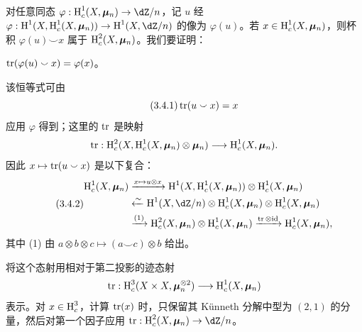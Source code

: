 \subsection{}\label{V:3-3}
对任意同态 $\varphi:\h_c^1(X,\dmu_n)\to\dZ/n$，记 $u$ 经
$\varphi:\h^1(X,\h_c^1(X,\dmu_n))\to\h^1(X,\dZ/n)$ 的像为 $\varphi(u)$。若 $x\in\operatorname{H}_c^1(X,{\bm\mu}_n)$，则杯积 $\varphi(u)\smallsmile x$ 属于 $\operatorname{H}_c^2(X,{\bm\mu}_n)$。我们要证明：

\begin{proposition_}\label{V:3-4}
$\operatorname{tr}(\varphi(u)\smallsmile x)=\varphi(x)$。
\end{proposition_}
该恒等式可由
\begin{equation*}\tag{3.4.1}\label{V:eq:3-4-1}
\operatorname{tr}(u\smallsmile x)=x
\end{equation*}
应用 $\varphi$ 得到；这里的 $\operatorname{tr}$ 是映射
\[
\operatorname{tr}:\operatorname{H}_c^2(X,\operatorname{H}_c^1(X,{\bm\mu}_n)\otimes{\bm\mu}_n)\longrightarrow\operatorname{H}_c^1(X,{\bm\mu}_n).
\]
因此 $x\mapsto\operatorname{tr}(u\smallsmile x)$ 是以下复合：
\begin{equation*}\tag{3.4.2}\label{V:eq:3-4-2}
\begin{aligned}
\h_c^1(X,\dmu_n)&\xrightarrow{x\mapsto u\otimes x}
\h^1(X,\h_c^1(X,\dmu_n))\otimes\h_c^1(X,\dmu_n)\\
&\xleftarrow{\sim}\h^1(X,\dZ/n)\otimes\h_c^1(X,\dmu_n)\otimes\h_c^1(X,\dmu_n)\\
&\xrightarrow{(1)}\h_c^2(X,\dmu_n)\otimes\h_c^1(X,\dmu_n)
\xrightarrow{\tr\otimes\mathrm{id}}\h_c^1(X,\dmu_n),
\end{aligned}
\end{equation*}
其中 (1) 由 $a\otimes b\otimes c\mapsto(a\smallsmile c)\otimes b$ 给出。

将这个态射用相对于第二投影的迹态射
\[
\operatorname{tr}:\operatorname{H}_c^3(X\times X,{\bm\mu}_n^{\otimes2})\longrightarrow\operatorname{H}_c^1(X,{\bm\mu}_n)
\]
表示。对 $x\in\operatorname{H}_c^3$，计算 $\operatorname{tr}(x)$ 时，只保留其 Künneth 分解中型为 $(2,1)$ 的分量，然后对第一个因子应用 $\tr:\h_c^2(X,\dmu_n)\to\dZ/n$。

